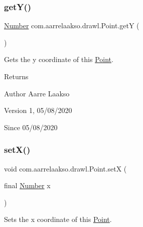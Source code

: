 \subsubsection{\texorpdfstring{get\+Y()}{getY()}}
{\footnotesize\ttfamily \hyperlink{interfacecom_1_1aarrelaakso_1_1drawl_1_1_number}{Number} com.\+aarrelaakso.\+drawl.\+Point.\+getY (\begin{DoxyParamCaption}{ }\end{DoxyParamCaption})\hspace{0.3cm}{\ttfamily [protected]}}



Gets the y coordinate of this \hyperlink{classcom_1_1aarrelaakso_1_1drawl_1_1_point}{Point}. 

\begin{DoxyReturn}{Returns}

\end{DoxyReturn}
\begin{DoxyAuthor}{Author}
Aarre Laakso 
\end{DoxyAuthor}
\begin{DoxyVersion}{Version}
1, 05/08/2020 
\end{DoxyVersion}
\begin{DoxySince}{Since}
05/08/2020 
\end{DoxySince}
\mbox{\label{classcom_1_1aarrelaakso_1_1drawl_1_1_point_acf1cca24c7cf879f402e1b549a5e3864}} 
\subsubsection{\texorpdfstring{set\+X()}{setX()}}
{\footnotesize\ttfamily void com.\+aarrelaakso.\+drawl.\+Point.\+setX (\begin{DoxyParamCaption}\item[{final \hyperlink{interfacecom_1_1aarrelaakso_1_1drawl_1_1_number}{Number}}]{x }\end{DoxyParamCaption})\hspace{0.3cm}{\ttfamily [protected]}}



Sets the x coordinate of this \hyperlink{classcom_1_1aarrelaakso_1_1drawl_1_1_point}{Point}. 


